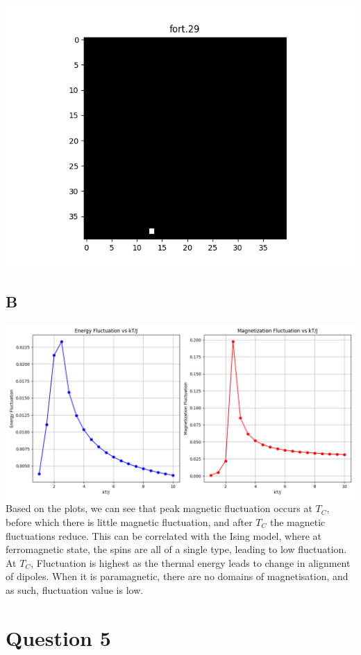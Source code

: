 \documentclass[11pt]{article}
\begin{document}
\includegraphics[scale=0.5]{fort.29.png}

\subsection{B}
\includegraphics[scale=0.5]{Q4b_EMFluc.png}\\
Based on the plots, we can see that peak magnetic fluctuation occurs at $T_C$, before which there is little magnetic fluctuation, and after $T_C$ the magnetic fluctuations reduce. This can be correlated with the Ising model, where at ferromagnetic state, the spins are all of a single type, leading to low fluctuation. At $T_C$, Fluctuation is highest as the thermal energy leads to change in alignment of dipoles. When it is paramagnetic, there are no domains of magnetisation, and as such, fluctuation value is low.

\section{Question 5}
\end{document}
